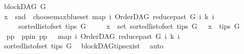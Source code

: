 \begin{isabellebody}
\ \ \ {\isachardoublequoteopen}blockDAG\ G{\isachardoublequoteclose}\isanewline
\ \ \ {\isachardoublequoteopen}x\ {\isacharequal}{\kern0pt}\ snd\ {\isacharparenleft}{\kern0pt}\ choose{\isacharunderscore}{\kern0pt}max{\isacharunderscore}{\kern0pt}blue{\isacharunderscore}{\kern0pt}set\ {\isacharparenleft}{\kern0pt}map\ {\isacharparenleft}{\kern0pt}{\isasymlambda}i{\isachardot}{\kern0pt}\ {\isacharparenleft}{\kern0pt}OrderDAG\ {\isacharparenleft}{\kern0pt}reduce{\isacharunderscore}{\kern0pt}past\ G\ i{\isacharparenright}{\kern0pt}\ k{\isacharcomma}{\kern0pt}\ i{\isacharparenright}{\kern0pt}{\isacharparenright}{\kern0pt}\isanewline
\ \ \ \ \ \ \ {\isacharparenleft}{\kern0pt}sorted{\isacharunderscore}{\kern0pt}list{\isacharunderscore}{\kern0pt}of{\isacharunderscore}{\kern0pt}set\ {\isacharparenleft}{\kern0pt}tips\ G{\isacharparenright}{\kern0pt}{\isacharparenright}{\kern0pt}{\isacharparenright}{\kern0pt}{\isacharparenright}{\kern0pt}{\isachardoublequoteclose}\ \isanewline
\ \ \ \ {\isachardoublequoteopen}x\ {\isasymin}\ set\ {\isacharparenleft}{\kern0pt}sorted{\isacharunderscore}{\kern0pt}list{\isacharunderscore}{\kern0pt}of{\isacharunderscore}{\kern0pt}set\ {\isacharparenleft}{\kern0pt}tips\ G{\isacharparenright}{\kern0pt}{\isacharparenright}{\kern0pt}{\isachardoublequoteclose}\ \ {\isachardoublequoteopen}\ x\ {\isasymin}\ tips\ G{\isachardoublequoteclose}\isanewline
%
\isadelimproof
%
\endisadelimproof
%
\isatagproof
{}\isamarkupfalse%
\ {\isacharminus}{\kern0pt}\ \isanewline
\ \ \isamarkupfalse%
\ pp\ \ pp{\isacharunderscore}{\kern0pt}in{\isacharcolon}{\kern0pt}\ {\isachardoublequoteopen}pp\ {\isacharequal}{\kern0pt}\ \ {\isacharparenleft}{\kern0pt}map\ {\isacharparenleft}{\kern0pt}{\isasymlambda}i{\isachardot}{\kern0pt}\ {\isacharparenleft}{\kern0pt}OrderDAG\ {\isacharparenleft}{\kern0pt}reduce{\isacharunderscore}{\kern0pt}past\ G\ i{\isacharparenright}{\kern0pt}\ k{\isacharcomma}{\kern0pt}\ i{\isacharparenright}{\kern0pt}{\isacharparenright}{\kern0pt}\isanewline
\ \ \ {\isacharparenleft}{\kern0pt}sorted{\isacharunderscore}{\kern0pt}list{\isacharunderscore}{\kern0pt}of{\isacharunderscore}{\kern0pt}set\ {\isacharparenleft}{\kern0pt}tips\ G{\isacharparenright}{\kern0pt}{\isacharparenright}{\kern0pt}{\isacharparenright}{\kern0pt}{\isachardoublequoteclose}\ \isamarkupfalse%
\ blockDAG{\isachardot}{\kern0pt}tips{\isacharunderscore}{\kern0pt}exist\ \isamarkupfalse%
\ auto\isanewline
\ \ \isamarkupfalse%

\end{isabellebody}
